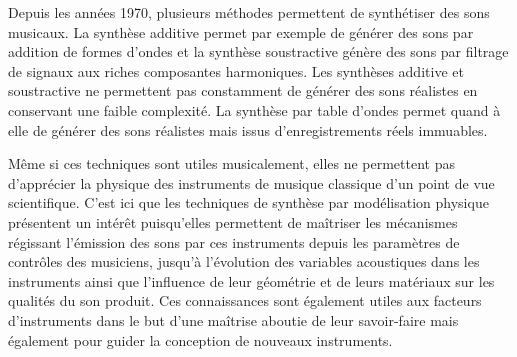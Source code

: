 \documentclass[french, twocolumn]{article}
\begin{document}

Depuis les années 1970, plusieurs méthodes permettent de synthétiser des sons musicaux. La synthèse additive permet par exemple de générer des sons par addition de formes d'ondes et la synthèse soustractive génère des sons par filtrage de signaux aux riches composantes harmoniques. Les synthèses additive et soustractive ne permettent pas constamment de générer des sons réalistes en conservant une faible complexité. La synthèse par table d'ondes permet quand à elle de générer des sons réalistes mais issus d'enregistrements réels immuables. 

Même si ces techniques sont utiles musicalement, elles ne permettent pas d'apprécier la physique des instruments de musique classique d'un point de vue scientifique. C'est ici que les techniques de synthèse par modélisation physique présentent un intérêt puisqu'elles permettent de maîtriser les mécanismes régissant l'émission des sons par ces instruments depuis les paramètres de contrôles des musiciens, jusqu'à l'évolution des variables acoustiques dans les instruments ainsi que l'influence de leur géométrie et de leurs matériaux sur les qualités du son produit. Ces connaissances sont également utiles aux facteurs d'instruments dans le but d'une maîtrise aboutie de leur savoir-faire mais également pour guider la conception de nouveaux instruments. 



\end{document}

